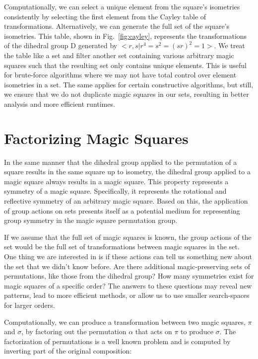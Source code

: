 \documentclass[12pt]{report}
\begin{document}
\par Computationally, we can select a unique element from the square's isometries consistently by
selecting the first element from the Cayley table of transformations. Alternatively, we can
generate the full set of the square's isometries. This table, shown in Fig.~\ref{fig:cayley},
represents the transformations of the dihedral group D generated by $<r,s\vert
  r^4=s^2={\left(sr\right)}^2=1>$. We treat the table like a set and filter another set containing
various arbitrary magic squares such that the resulting set only contains unique elements. This is
useful for brute-force algorithms where we may not have total control over element isometries in a
set. The same applies for certain constructive algorithms, but still, we ensure that we do not
duplicate magic squares in our sets, resulting in better analysis and more efficient runtimes.

\section{Factorizing Magic Squares}

\par In the same manner that the dihedral group applied to the permutation of a square results in
the same square up to isometry, the dihedral group applied to a magic square always results in a
magic square. This property represents a symmetry of a magic square. Specifically, it represents
the rotational and reflective symmetry of an arbitrary magic square. Based on this, the application
of group actions on sets presents itself as a potential medium for representing group symmetry in
the magic square permutation group.

\par If we assume that the full set of magic squares is known, the group actions of the set would
be the full set of transformations between magic squares in the set. One thing we are interested in
is if these actions can tell us something new about the set that we didn't know before. Are there
additional magic-preserving sets of permutations, like those from the dihedral group? How many
symmetries exist for magic squares of a specific order? The answers to these questions may reveal
new patterns, lead to more efficient methods, or allow us to use smaller search-spaces for larger
orders.

\par Computationally, we can produce a transformation between two magic squares, $\pi$ and
$\sigma$, by factoring out the permutation $\alpha$ that acts on $\pi$ to produce $\sigma$. The
factorization of permutations is a well known problem and is computed by inverting part of the
original composition:
\end{document}

